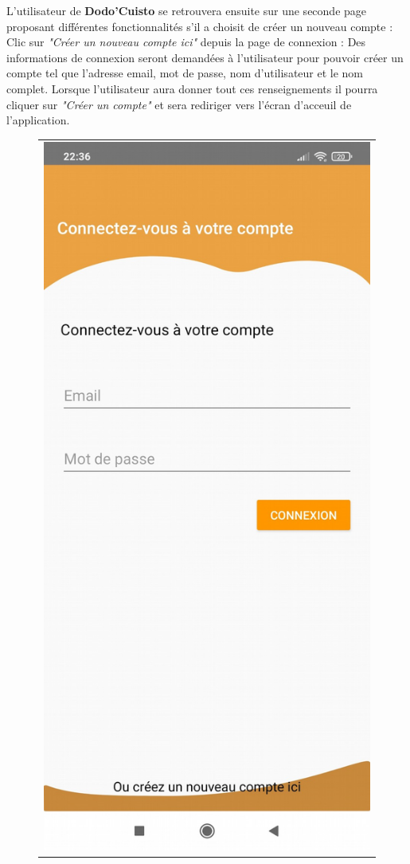 \documentclass{article}
\begin{document}
L’utilisateur de \textbf{Dodo’Cuisto} se retrouvera ensuite sur une seconde page proposant différentes fonctionnalités s’il a choisit de créer un nouveau compte :
Clic sur \textit{"Créer un nouveau compte ici"} depuis la page de connexion : Des informations de connexion seront demandées à l’utilisateur pour pouvoir créer un compte tel que l’adresse email, mot de passe, nom d’utilisateur et le nom complet. Lorsque l’utilisateur aura donner tout ces renseignements il pourra cliquer sur \textit{"Créer un compte"} et sera rediriger vers l’écran d’acceuil de l’application.

\begin{figure}
    \centering
    \begin{tabular}{@{}c@{}}
        \includegraphics[scale=0.152]{connexion.png}

\end{tabular}
\end{figure}
\end{document}
